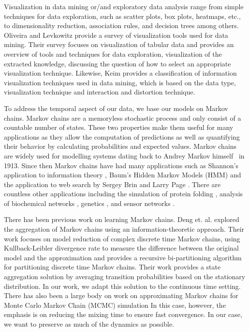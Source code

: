 Visualization in data mining or/and exploratory data analysis range from simple techniques for data exploration, such as
scatter plots, box plots, heatmaps, etc., to dimensionality reduction, %
association rules, and decision trees among others.  %
%
Oliveira and Levkowitz \cite{1207445} provide a survey of visualization tools used for data mining. Their survey focuses
on visualization of tabular data and provides an overview of tools and techniques for data exploration,
visualization of the extracted knowledge, discussing the question of how to select an appropriate visualization
technique.
%
Likewise, Keim \cite{981847} provides a classification of information visualization techniques used in data mining, which is based on
the data type, visualization technique and interaction and distortion technique.

To address the temporal aspect of our data, we base our models on  Markov chains. Markov chains are a memoryless stochastic process and only consist of a countable number of states. These two properties make them useful for many applications as they allow the computation of predictions as
well as quantifying their behavior by calculating probabilities and expected values. Markov chains are widely used for modelling systems dating back to Andrey Markov himself~\cite{markov13} in 1913. Since then
Markov chains have had many applications such as Shannon's application to information theory \cite{Shannon:1948},
Baum's Hidden Markov Models (HMM) \cite{baum1970} and the application to web search by Sergey Brin and Larry Page \cite{Lawrence981}. 
%
There are countless other applications including the simulation of protein folding \cite{pande-beauchamp-bowman:2010:methods:markov-model-review},
analysis of biochemical networks \cite{Ciocchetta2009145},
genetics \cite{Huelsenbeck2310}, and 
sensor networks \cite{DBLP:journals/corr/AlsheikhHNTL15}.%

There has been previous work on learning Markov chains. Deng et. al. \cite{5746509} explored the aggregation of Markov chains using an information-theoretic
approach. Their work focuses on model reduction of complex discrete time Markov chains, using Kullback-Leibler divergence
rate to measure the difference between the original model and the approximation and provides a recursive bi-partitioning
algorithm for partitioning discrete time Markov chains. Their work provides a state aggregation solution by averaging
transition probabilities based on the stationary distribution. In our work, we adapt this solution to the continuous time
setting.
%
There has also been a large body on work on approximating Markov chains for Monte Carlo Markov Chain (MCMC) simulation \cite{RSSD:RSSD117,HASTINGS01041970}
In this case, however, the emphasis is on reducing the mixing time to ensure fast convergence. In our case, we want to preserve as much of the dynamics as possible. 


